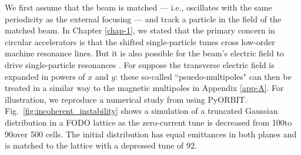 We first assume that the beam is matched — i.e., oscillates with the same periodicity as the external focusing — and track a particle in the field of the matched beam. In Chapter \ref{chap-1}, we stated that the primary concern in circular accelerators is that the shifted single-particle tunes cross low-order machine resonance lines. But it is also possible for the beam's electric field to drive single-particle resonances \cite{Holmes1999, Jeon1999, Li2014, Kojima2019, Asvesta2020}. For suppose the transverse electric field is expanded in powers of $x$ and $y$: these so-called ``psuedo-multipoles" can then be treated in a similar way to the magnetic multipoles in Appendix \ref{app-A}. For illustration, we reproduce a numerical study from \cite{Hofmann2017Book} using PyORBIT. Fig.~\ref{fig:incoherent_instability} shows a simulation of a truncated Gaussian distribution in a FODO lattice as the zero-current tune is decreased from 100\degree to 90\degree over 500 cells. The initial distribution has equal emittances in both planes and is matched to the lattice with a depressed tune of 92\degree.
%
